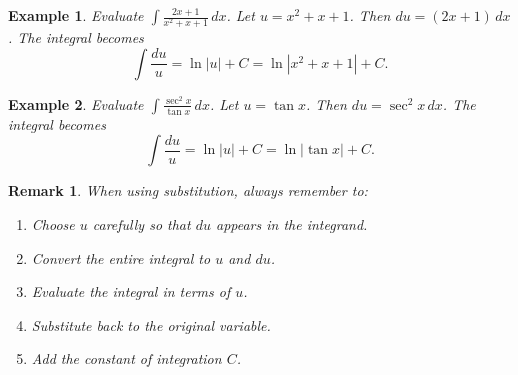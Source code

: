 \documentclass[11pt,a4paper]{article}
\newtheorem{example}{Example}
\newtheorem{remark}{Remark}
\begin{document}
\begin{example}
Evaluate $\displaystyle \int \frac{2x + 1}{x^2 + x + 1} \, dx$.
Let $u = x^2 + x + 1$. Then $du = (2x + 1) \, dx$. The integral becomes
\[
\int \frac{du}{u} = \ln|u| + C = \ln|x^2 + x + 1| + C.
\]
\end{example}
\begin{example}
Evaluate $\displaystyle \int \frac{\sec^2 x}{\tan x} \, dx$.
Let $u = \tan x$. Then $du = \sec^2 x \, dx$. The integral becomes
\[
\int \frac{du}{u} = \ln|u| + C = \ln|\tan x| + C.
\]
\end{example}
\begin{remark}
When using substitution, always remember to:
\begin{enumerate}
\item Choose $u$ carefully so that $du$ appears in the integrand.
\item Convert the entire integral to $u$ and $du$.
\item Evaluate the integral in terms of $u$.
\item Substitute back to the original variable.
\item Add the constant of integration $C$.
\end{enumerate}
\end{remark}
\end{document}
